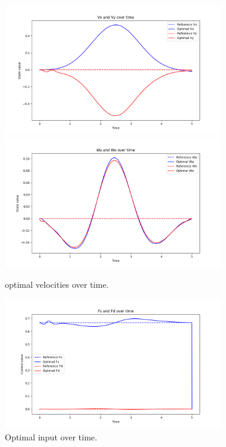 \begin{figure}[H]
  \centering
  \includegraphics[width=0.85\textwidth]{pictures/Figure_3_opt_smooth.png}\hfill \\
  \includegraphics[width=0.85\textwidth]{pictures/Figure_4_opt_smooth.png}\hfill
  \caption{optimal velocities over time.}
  \label{fig:Reference trajectory}
  \includegraphics[width=0.85\textwidth]{pictures/Figure_5_opt_smooth.png}
  \caption{Optimal input over time.}
  \label{fig:Reference trajectory}
\end{figure}


